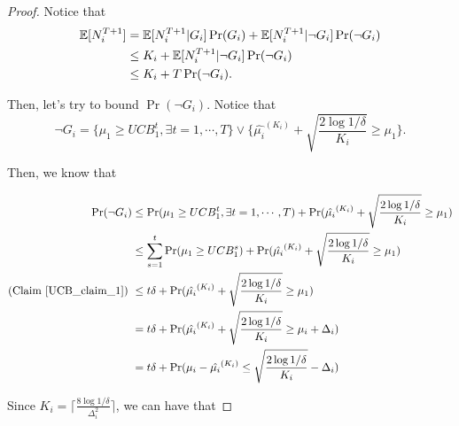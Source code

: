 \documentclass[../main.tex]{subfiles}
\begin{document}
	\begin{proof}
		Notice that 
		\begin{equation*}
			\begin{aligned}
				\mathbb{E}[N_i^{T+1}] & = \mathbb{E}[N_i^{T+1} | G_i] \Pr(G_i) + \mathbb{E}[N_i^{T+1} | \neg G_i] \Pr(\neg G_i)\\
							   & \leq K_i +  \mathbb{E}[N_i^{T+1} | \neg G_i] \Pr(\neg G_i) \\
							   & \leq K_i + T  \Pr(\neg G_i).
			\end{aligned}
		\end{equation*}
		
		Then, let's try to bound $\Pr(\neg G_i)$. Notice that 
		\begin{equation*}
			\neg G_i = \{ \mu_1 \geq UCB_1^t, \exists t = 1,\cdots, T\} \vee \{\hat{\mu_i}^{(K_i)} + \sqrt{\frac{2\log 1/ \delta}{K_i}} \geq \mu_1 \}.
		\end{equation*}		
		
		Then, we know that 
		
		\begin{equation*}
			\begin{aligned}
				\Pr(\neg G_i) & \leq \Pr(\mu_1 \geq UCB_1^t, \exists t = 1,\cdots, T) + \Pr(\hat{\mu_i}^{(K_i)} + \sqrt{\frac{2\log 1/ \delta}{K_i}} \geq \mu_1 ) \\
							  & \leq \sum\limits_{s=1}^t \Pr(\mu_1 \geq UCB_1^s) +   \Pr(\hat{\mu_i}^{(K_i)} + \sqrt{\frac{2\log 1/ \delta}{K_i}} \geq \mu_1 ) \\
							  (\textmd{Claim \ref{UCB_claim_1}})\ & \leq t\delta + \Pr(\hat{\mu_i}^{(K_i)} + \sqrt{\frac{2\log 1/ \delta}{K_i}} \geq \mu_1 ) \\
							  & = t\delta + \Pr(\hat{\mu_i}^{(K_i)} + \sqrt{\frac{2\log 1/ \delta}{K_i}} \geq \mu_i + \Delta_i ) \\
							  & = t\delta + \Pr(\mu_i  - \hat{\mu_i}^{(K_i)} \leq  \sqrt{\frac{2\log 1/ \delta}{K_i}} - \Delta_i ) \\
			\end{aligned}
		\end{equation*}
		
		Since $K_i = \lceil \frac{8 \log 1 / \delta}{\Delta_i^2} \rceil $, we can have that
		

\end{proof}
\end{document}
